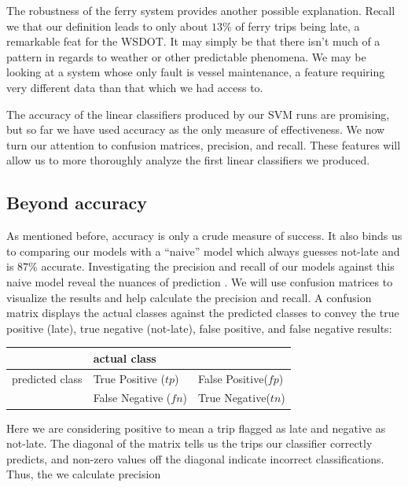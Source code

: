 \documentclass[11pt]{article} %
\begin{document}
The robustness of the ferry system provides another possible explanation. Recall 
we that
our definition leads to only about $13\%$ of ferry trips being late, a remarkable 
feat for the WSDOT. It may simply be that there isn't much of a pattern in regards
to weather or other predictable phenomena. We may be looking at a system whose
only fault is vessel maintenance, a feature requiring very different data than
that which we had access to. 

The accuracy of the linear classifiers produced by our SVM runs are promising,
but so far we have used accuracy as the only measure of effectiveness. We now 
turn our attention to confusion matrices, precision, and recall. These features
will allow us to more thoroughly analyze the first linear classifiers we produced.

\subsection{Beyond accuracy}
\label{sec:beyond_accuracy}
As mentioned before, accuracy is only a crude measure of success. It also binds us
to comparing our models with a ``naive'' model which always guesses not-late and
is $87\%$ accurate. Investigating the precision and recall of our models against
this naive model reveal the nuances of prediction \cite{classifierEval}. 
We will use confusion matrices to visualize the results and help calculate the 
precision and recall. A confusion matrix displays the actual classes against 
the predicted classes to convey the true positive (late), true negative 
(not-late), false positive, and false negative results:

\begin{center}
\begin{tabular}[h]{l|ll}
                     & actual class &  \\
     \hline
     predicted class & True Positive ($tp$)& False Positive($fp$)\\
                     & False Negative ($fn$)& True Negative($tn$)\\
\end{tabular}
\end{center}

Here we are considering positive to mean a trip flagged as 
late and negative as not-late. The diagonal of the matrix tells us the trips our
classifier correctly predicts, and non-zero values off the diagonal indicate 
incorrect classifications. Thus, the we calculate precision 
\end{document}
